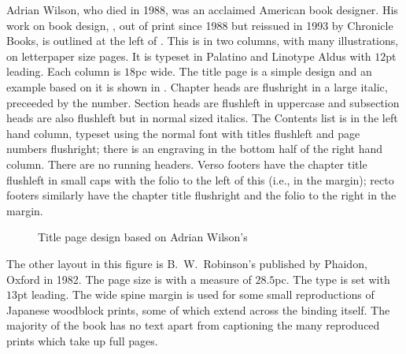 \documentclass[10pt,a4paper,extrafontsizes]{memoir}
\begin{document}
\begin{paracol}{2}
\switchEng
    Adrian Wilson, who died in 1988, was an 
acclaimed American book designer.
His work on book design, , out of print since
1988 but reissued in 1993 by Chronicle Books, is outlined
at the left of . This is in two columns, 
with many illustrations,
on letterpaper size pages. 
It is typeset in Palatino and 
Linotype Aldus 
with $12$pt leading. 
Each column is $18$pc wide. The title page is a simple design and an
example based on it is shown in . 
Chapter heads are 
flushright in a large italic, preceeded by the number. 
Section heads are flushleft in uppercase and 
subsection heads are also flushleft but in normal sized italics.
The Contents list is in the left hand column, typeset 
using the normal font with titles flushleft and page numbers flushright;
there is an engraving in the bottom half of the right hand column.
There are no running headers. Verso footers have the
chapter title flushleft in small caps with the folio
to the left of this (i.e., in the margin); recto footers similarly have
the chapter title flushright and the folio to the right in the margin.
\end{paracol}

\begin{figure}
\centering
\begin{showtitle}
\titleDB
\end{showtitle}
\caption{Title page design based on Adrian Wilson's } \label{fig:titleDB}
\end{figure}

\begin{paracol}{2}
\switchEng
The other layout in this
figure is B.~W.~Robinson's  published
by Phaidon, Oxford in 1982. The page size is  with a
measure of $28.5$pc. The type is set with $13$pt leading. The wide spine
margin is used for some small 
reproductions of Japanese 
woodblock prints, some of which extend across the binding itself. 
The majority of the book has no text apart from captioning the many 
reproduced prints which take up full pages.
\end{paracol}
\end{document}
